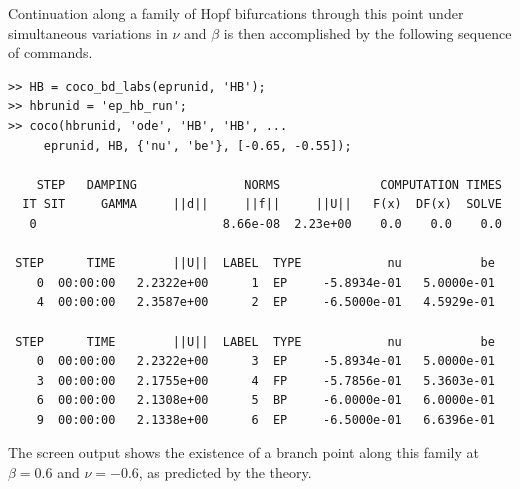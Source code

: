 Continuation along a family of Hopf bifurcations through this point under simultaneous variations in $\nu$ and $\beta$ is then accomplished by the following sequence of commands.
\begin{lstlisting}[language=coco-highlight,frame=lines]
>> HB = coco_bd_labs(eprunid, 'HB');
>> hbrunid = 'ep_hb_run';
>> coco(hbrunid, 'ode', 'HB', 'HB', ...
     eprunid, HB, {'nu', 'be'}, [-0.65, -0.55]);

    STEP   DAMPING               NORMS              COMPUTATION TIMES
  IT SIT     GAMMA     ||d||     ||f||     ||U||   F(x)  DF(x)  SOLVE
   0                          8.66e-08  2.23e+00    0.0    0.0    0.0

 STEP      TIME        ||U||  LABEL  TYPE            nu           be
    0  00:00:00   2.2322e+00      1  EP     -5.8934e-01   5.0000e-01
    4  00:00:00   2.3587e+00      2  EP     -6.5000e-01   4.5929e-01

 STEP      TIME        ||U||  LABEL  TYPE            nu           be
    0  00:00:00   2.2322e+00      3  EP     -5.8934e-01   5.0000e-01
    3  00:00:00   2.1755e+00      4  FP     -5.7856e-01   5.3603e-01
    6  00:00:00   2.1308e+00      5  BP     -6.0000e-01   6.0000e-01
    9  00:00:00   2.1338e+00      6  EP     -6.5000e-01   6.6396e-01

\end{lstlisting}
The screen output shows the existence of a branch point along this family at $\beta=0.6$ and $\nu=-0.6$, as predicted by the theory. 

